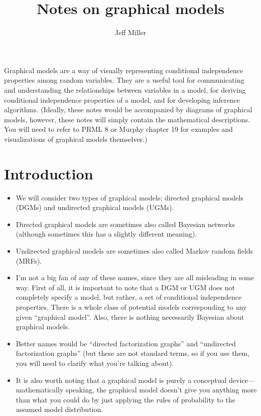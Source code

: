 \documentclass[12pt]{article}
\title{Notes on graphical models
}
\author{Jeff Miller}
\begin{document}
\maketitle

\tableofcontents



\vspace{2em}

Graphical models are a way of visually representing conditional independence properties among random variables. They are a useful tool for communicating and understanding the relationships between variables in a model, for deriving conditional independence properties of a model, and for developing inference algorithms. (Ideally, these notes would be accompanied by diagrams of graphical models, however, these notes will simply contain the mathematical descriptions. You will need to refer to PRML 8 or Murphy chapter 19 for examples and visualizations of graphical models themselves.)

\section{Introduction}

\begin{itemize}
\item We will consider two types of graphical models: directed graphical models (DGMs) and undirected graphical models (UGMs).
\item Directed graphical models are sometimes also called Bayesian networks (although sometimes this has a slightly different meaning).
\item Undirected graphical models are sometimes also called Markov random fields (MRFs).
\item I'm not a big fan of any of these names, since they are all misleading in some way. First of all, it is important to note that a DGM or UGM does not completely specify a model, but rather, a set of conditional independence properties. There is a whole class of potential models corresponding to any given ``graphical model''. Also, there is nothing necessarily Bayesian about graphical models.
\item Better names would be ``directed factorization graphs'' and ``undirected factorization graphs'' (but these are not standard terms, so if you use them, you will need to clarify what you're talking about).
\item It is also worth noting that a graphical model is purely a conceptual device---mathematically speaking, the graphical model doesn't give you anything more than what you could do by just applying the rules of probability to the assumed model distribution.
\end{itemize}
\end{document}
